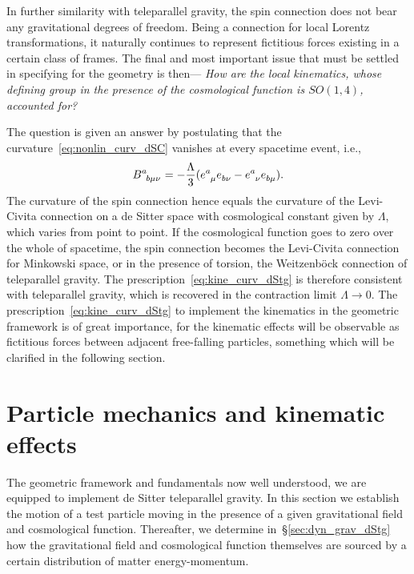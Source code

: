 \documentclass[
final,
11pt,
a4paper,
DIV=11,
headinclude=true,
footinclude=false,
bibliography=totoc,
twoside=true,  %
BCOR=5mm
]{scrbook}
\begin{document}
In further similarity with teleparallel gravity, the spin 
connection does not bear any gravitational degrees of freedom.  
Being a connection for local Lorentz transformations, it 
naturally continues to represent fictitious forces existing in 
a certain class of frames. The final and most important issue 
that must be settled in specifying for the geometry is then--- 
\emph{How are the local kinematics, whose defining group in the 
  presence of the cosmological function is $SO(1,4)$, accounted 
  for?}

The question is given an answer by postulating that the 
curvature~\eqref{eq:nonlin_curv_dSC} vanishes at every spacetime 
event, i.e.,
\begin{equation}
\label{eq:kine_curv_dStg}
  B\ind{^a_{b\mu\nu}} = -\frac{\Lambda}{3} (e\ind{^a_\mu} 
  e\ind{_{b\nu}} - e\ind{^a_\nu} e\ind{_{b\mu}}).
\end{equation}
The curvature of the spin connection hence equals the curvature 
of the Levi-Civita connection on a de Sitter space with 
cosmological constant given by $\Lambda$, which varies from point 
to point. If the cosmological function goes to zero over the 
whole of spacetime, the spin connection becomes the Levi-Civita 
connection for Minkowski space, or in the presence of torsion, 
the Weitzenb\"ock connection of teleparallel gravity. The 
prescription~\eqref{eq:kine_curv_dStg} is therefore consistent 
with teleparallel gravity, which is recovered in the contraction 
limit $\Lambda \to 0$. The prescription~\eqref{eq:kine_curv_dStg} 
to implement the kinematics in the geometric framework is of 
great importance, for the kinematic effects will be observable as 
fictitious forces between adjacent free-falling particles, 
something which will be clarified in the following section. 

\section{Particle mechanics and kinematic effects}
\label{sec:dStg_part_mech}

The geometric framework and fundamentals now well understood, we 
are equipped to implement de Sitter teleparallel gravity.  In 
this section we establish the motion of a test particle moving in 
the presence of a given gravitational field and cosmological 
function. Thereafter, we determine in~\S\ref{sec:dyn_grav_dStg} 
how the gravitational field and cosmological function themselves 
are sourced by a certain distribution of matter energy-momentum.
\end{document}
